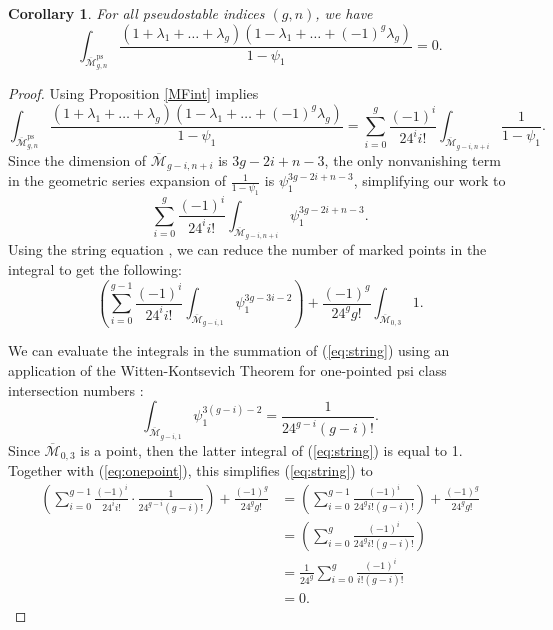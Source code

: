 \documentclass[leqno,12pt]{amsart}
\newtheorem{corollary}[theorem]{Corollary}
\theoremstyle{remark}
\numberwithin{equation}{section}
\DeclareMathOperator{\ps}{ps}
\begin{document}
\begin{corollary}
    \label{MFintcor}For all pseudostable indices $(g, n)$, we have
    $$\int_{\overline{\mathcal{M}}^{\ps}_{g, n}}\frac{(1 + \lambda_1 + \dots + \lambda_g)(1 - \lambda_1 + \dots + (-1)^g\lambda_g)}{1-\psi_1} = 0.$$
\end{corollary}
\begin{proof} Using Proposition \ref{MFint} implies
\begin{equation*}
    \int_{\overline{\mathcal{M}}^{\ps}_{g, n}}\frac{(1 + \lambda_1 + \dots + \lambda_g)(1 - \lambda_1 + \dots + (-1)^g\lambda_g)}{1-\psi_1} = \sum_{i=0}^g\frac{(-1)^i}{24^ii!}\int_{\overline{\mathcal{M}}_{g-i, n+i}}\frac{1}{1-\psi_1}.
\end{equation*}    
Since the dimension of $\overline{\mathcal{M}}_{g-i, n+i}$ is $3g-2i + n - 3$, the only nonvanishing term in the geometric series expansion of $\frac{1}{1-\psi_1}$ is $\psi_1^{3g-2i+n-3}$, simplifying our work to 
\begin{equation}\label{eq:stringtoo}
\sum_{i=0}^g\frac{(-1)^i}{24^ii!}\int_{\overline{\mathcal{M}}_{g-i, n+i}}\psi_1^{3g-2i+n-3}.
\end{equation}
Using the string equation \cite{witten1990two}, we can reduce the number of marked points in the integral to get the following:
\begin{equation}\label{eq:string}
    \left(\sum_{i=0}^{g-1}\frac{(-1)^i}{24^ii!}\int_{\overline{\mathcal{M}}_{g-i, 1}}\psi_1^{3g-3i-2}\right) + \frac{(-1)^g}{24^gg!}\int_{\overline{\mathcal{M}}_{0, 3}}1.
\end{equation}

We can evaluate the integrals in the summation of (\ref{eq:string}) using an application of the Witten-Kontsevich Theorem for one-pointed psi class intersection numbers \cite{WKT}: 
\begin{equation}\label{eq:onepoint}
    \int_{\overline{\mathcal{M}}_{g-i, 1}} \psi_1^{3(g-i)-2} = \frac{1}{24^{g-i}(g-i)!}.  
\end{equation}
Since $\overline{\mathcal{M}}_{0, 3}$ is a point, then the latter integral of (\ref{eq:string}) is equal to 1. Together with (\ref{eq:onepoint}), this simplifies (\ref{eq:string}) to 
\begin{align}\label{eq:1/24}
    \left(\sum_{i=0}^{g-1}\frac{(-1)^i}{24^ii!} \cdot \frac{1}{24^{g-i}(g-i)!}\right) + \frac{(-1)^g}{24^gg!} &= \left(\sum_{i=0}^{g-1}\frac{(-1)^i}{24^gi!(g-i)!}\right) + \frac{(-1)^g}{24^gg!}\nonumber\\
    &= \left(\sum_{i=0}^{g}\frac{(-1)^i}{24^gi!(g-i)!}\right)\nonumber\\
    &= \frac{1}{24^g}\sum_{i=0}^g\frac{(-1)^i}{i!(g-i)!}\\
    &= 0.\nonumber
\end{align}
\end{proof}
\end{document}
